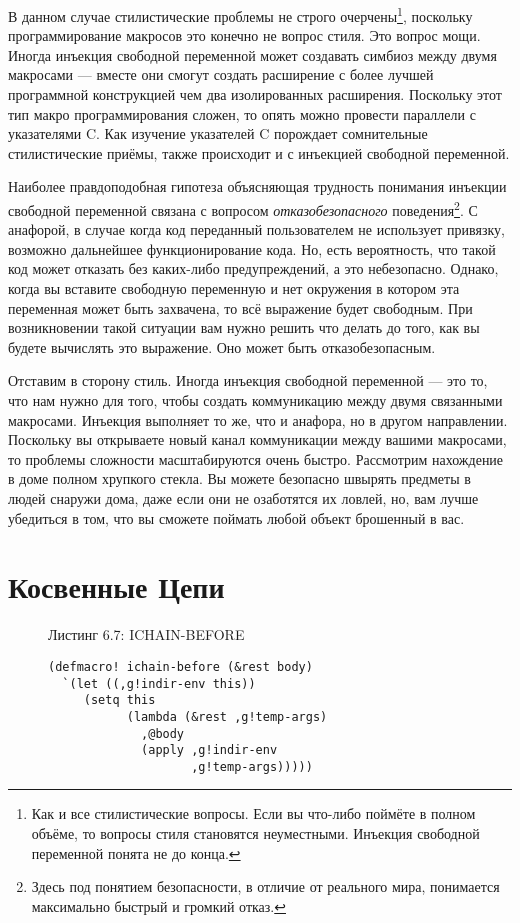 В данном случае стилистические проблемы не строго очерчены\footnote{Как и все стилистические вопросы. Если вы что-либо поймёте в полном объёме, то вопросы стиля становятся неуместными. Инъекция свободной переменной понята не до конца.}, поскольку программирование макросов это конечно не вопрос стиля. Это вопрос мощи. Иногда инъекция свободной переменной может создавать симбиоз между двумя макросами --- вместе они смогут создать расширение с более лучшей программной конструкцией чем два изолированных расширения. Поскольку этот тип макро программирования сложен, то опять можно провести параллели с указателями C. Как изучение указателей C порождает сомнительные стилистические приёмы, также происходит и с инъекцией свободной переменной.



Наиболее правдоподобная гипотеза объясняющая трудность понимания инъекции свободной переменной связана с вопросом \emph{отказобезопасного} поведения\footnote{Здесь под понятием безопасности, в отличие от реального мира, понимается максимально быстрый и громкий отказ.}. С анафорой, в случае когда код переданный пользователем не использует привязку, возможно дальнейшее функционирование кода. Но, есть вероятность, что такой код может отказать без каких-либо предупреждений, а это небезопасно. Однако, когда вы вставите свободную переменную и нет окружения в котором эта переменная может быть захвачена, то всё выражение будет свободным. При возникновении такой ситуации вам нужно решить что делать до того, как вы будете вычислять это выражение. Оно может быть отказобезопасным.

Отставим в сторону стиль. Иногда инъекция свободной переменной --- это то, что нам нужно для того, чтобы создать коммуникацию между двумя связанными макросами. Инъекция выполняет то же, что и анафора, но в другом направлении. Поскольку вы открываете новый канал коммуникации между вашими макросами, то проблемы сложности масштабируются очень быстро. Рассмотрим нахождение в доме полном хрупкого стекла. Вы можете безопасно швырять предметы в людей снаружи дома, даже если они не озаботятся их ловлей, но, вам лучше убедиться в том, что вы сможете поймать любой объект брошенный в вас.

\section{Косвенные Цепи}\label{section_indirection_chains}



\begin{figure}Листинг 6.7: ICHAIN-BEFORE\label{listing_6.7}
\listbegin
\begin{verbatim}
(defmacro! ichain-before (&rest body)
  `(let ((,g!indir-env this))
     (setq this
           (lambda (&rest ,g!temp-args)
             ,@body
             (apply ,g!indir-env
                    ,g!temp-args)))))
\end{verbatim}
\listend
\end{figure}

